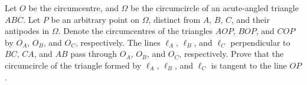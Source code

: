 Let $O$ be the circumcentre, and $\Omega$ be the circumcircle of an acute-angled triangle $ABC$. Let $P$ be an arbitrary point on $\Omega$, distinct from $A$, $B$, $C$, and their antipodes in $\Omega$. Denote the circumcentres of the triangles $AOP$, $BOP$, and $COP$ by $O_A$, $O_B$, and $O_C$, respectively. The lines $\ell_A$, $\ell_B$, and $\ell_C$ perpendicular to $BC$, $CA$, and $AB$ pass through $O_A$, $O_B$, and $O_C$, respectively. Prove that the circumcircle of the triangle formed by $\ell_A$, $\ell_B$, and $\ell_C$ is tangent to the line $OP$.
